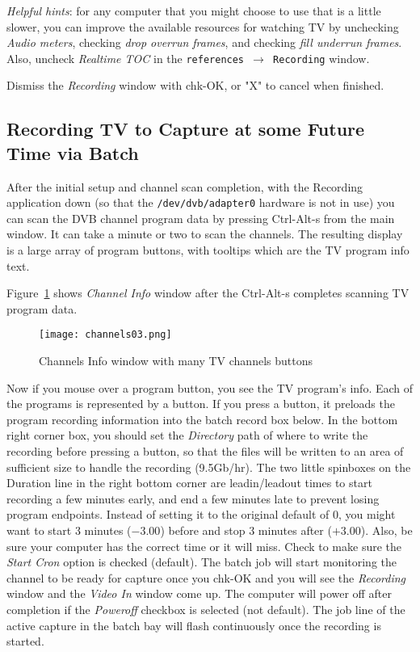 \textit{Helpful hints}:  for any computer that you might choose to use that is a little slower, you can improve the available resources for watching TV by unchecking \textit{Audio meters}, checking \textit{drop overrun frames}, and checking \textit{fill underrun frames}.  Also, uncheck \textit{Realtime TOC} in the \texttt{references $\rightarrow$ Recording} window.

Dismiss the \textit{Recording} window with chk-OK, or "X" to cancel when finished.

\subsection{Recording TV to Capture at some Future Time via Batch}%
\label{sub:recording_tv_future_time_batch}

After the initial setup and channel scan completion, with the Recording application down (so that the \texttt{/dev/dvb/adapter0} hardware is not in use) you can scan the DVB channel program data by pressing Ctrl-Alt-s from the main window.   It can take a minute or two to scan the channels.  The resulting display is a large array of program buttons, with tooltips which are the TV program info text.  

Figure~\ref{fig:channels03} shows \textit{Channel Info} window after the Ctrl-Alt-s completes scanning TV program data.

\begin{figure}[htpb]
    \centering
    \texttt{[image: channels03.png]}
    \caption{Channels Info window with many TV channels buttons}
    \label{fig:channels03}
\end{figure}

Now if you mouse over a program button, you see the TV  program's info.  Each of the programs is represented by a button.  If you press a button, it preloads the program recording information into the batch record box below.  In the bottom right corner box, you should set the \textit{Directory} path of where to write the recording before pressing a button, so that the files will be written to an area of sufficient size to handle the recording (9.5Gb/hr).  The two little spinboxes on the Duration line in the right bottom corner are leadin/leadout times to start recording a few minutes early, and end a few minutes late to prevent losing program endpoints.  Instead of setting it to the original default of 0, you might want to start 3 minutes ($-3.00$) before and stop 3 minutes after ($+3.00$).  Also, be sure your computer has the correct time or it will miss.  Check to make sure the \textit{Start Cron} option is checked (default).  The batch job will start monitoring the channel to be ready for capture once you chk-OK and you will see the \textit{Recording} window and the \textit{Video In} window come up.  The computer will power off after completion if the \textit{Poweroff} checkbox is selected (not default).  The job line of the active capture in the batch bay will flash continuously once the recording is started.

